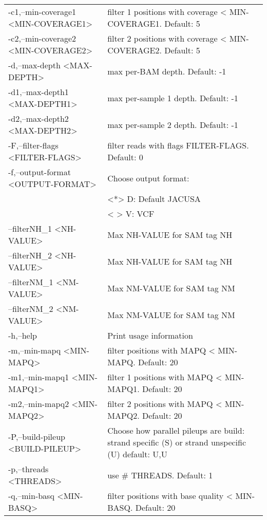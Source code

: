 \documentclass[10pt, a4paper]{article}
\begin{document}
\begin{table}
{\begin{tabular}{p{}p{}}
 -c1,--min-coverage1 <MIN-COVERAGE1>            & filter 1 positions with coverage < MIN-COVERAGE1. Default: 5 \\
 -c2,--min-coverage2 <MIN-COVERAGE2>            & filter 2 positions with coverage < MIN-COVERAGE2. Default: 5 \\
 -d,--max-depth <MAX-DEPTH>                     & max per-BAM depth. Default: -1 \\
 -d1,--max-depth1 <MAX-DEPTH1>                  & max per-sample 1 depth. Default: -1 \\
 -d2,--max-depth2 <MAX-DEPTH2>                  & max per-sample 2 depth. Default: -1 \\
 -F,--filter-flags <FILTER-FLAGS>               & filter reads with flags FILTER-FLAGS. Default: 0 \\
 -f,--output-format <OUTPUT-FORMAT>             & Choose output format: \\
                                                & <*> D: Default JACUSA \\
                                                & < > V: VCF \\
    --filterNH\_1 <NH-VALUE>                    & Max NH-VALUE for SAM tag NH \\
    --filterNH\_2 <NH-VALUE>                    & Max NH-VALUE for SAM tag NH \\
    --filterNM\_1 <NM-VALUE>                    & Max NM-VALUE for SAM tag NM \\
    --filterNM\_2 <NM-VALUE>                    & Max NM-VALUE for SAM tag NM \\
 -h,--help                                      & Print usage information \\
 -m,--min-mapq <MIN-MAPQ>                       & filter positions with MAPQ < MIN-MAPQ. Default: 20 \\
 -m1,--min-mapq1 <MIN-MAPQ1>                    & filter 1 positions with MAPQ < MIN-MAPQ1. Default: 20 \\
 -m2,--min-mapq2 <MIN-MAPQ2>                    & filter 2 positions with MAPQ < MIN-MAPQ2. Default: 20 \\
 -P,--build-pileup <BUILD-PILEUP>               & Choose how parallel pileups are build: strand specific (S) or strand unspecific (U) default: U,U \\
 -p,--threads <THREADS>                         & use \# THREADS. Default: 1 \\
 -q,--min-basq <MIN-BASQ>                       & filter positions with base quality < MIN-BASQ. Default: 20 \\

\end{tabular}}
\end{table}
\end{document}
